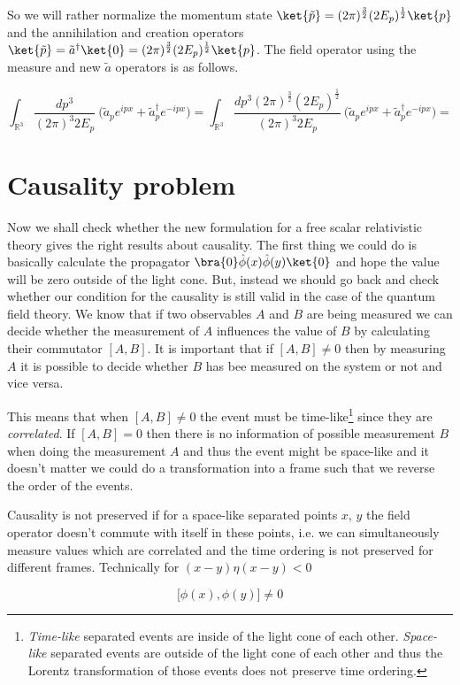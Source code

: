 So we will rather normalize the momentum state $\ket{\tilde{p}} = (2 \pi)^{\frac{3}{2}} (2 E_{p})^{\frac{1}{2}} \ket{p}$ and
the annihilation and creation operators $\ket{\tilde{p}} = \tilde{a}^{\dagger} \ket{0} = (2 \pi)^{\frac{3}{2}} (2 E_{p})^{\frac{1}{2}} \ket{p}$.
The field operator using the measure and new $\tilde{a}$ operators is as follows.

\begin{equation*}
    \int_{\mathbb{R}^{3}} \frac{dp^{3}}{(2 \pi)^{3} 2 E_{p}} \ \big(\tilde{a}_{p} e^{i p x} + \tilde{a}^{\dagger}_{p} e^{- i p x}\big) = 
    \int_{\mathbb{R}^{3}} \frac{dp^{3} (2 \pi)^{\frac{3}{2}} (2 E_{p})^{\frac{1}{2}}}{(2 \pi)^{3} 2 E_{p}} \ \big(\tilde{a}_{p} e^{i p x} + \tilde{a}^{\dagger}_{p} e^{- i p x}\big) = 
\end{equation*}

\section{Causality problem}

Now we shall check whether the new formulation for a free scalar relativistic theory gives the right results about causality.
The first thing we could do is basically calculate the propagator $\bra{0} \hat{\phi}(x) \hat{\phi}(y) \ket{0}$ and hope the 
value will be zero outside of the light cone. But, instead we should go back and check whether our condition for the causality
is still valid in the case of the quantum field theory. We know that if two observables $A$ and $B$ are being measured we can
decide whether the measurement of $A$ influences the value of $B$ by calculating their commutator $[A, B]$. It is important that
if $[A, B] \neq 0$ then by measuring $A$ it is possible to decide whether $B$ has bee measured on the system or not and vice 
versa.

This means that when $[A, B] \neq 0$ the event must be time-like\footnote{
\textit{Time-like} separated events are inside of the light cone of each other.
\textit{Space-like} separated events are outside of the light cone of each other and thus the Lorentz transformation of those 
events does not preserve time ordering.} since they are \textit{correlated}. If $[A, B] = 0$ then there is no information of possible
measurement $B$ when doing the measurement $A$ and thus the event might be space-like and it doesn't matter we could do a transformation
into a frame such that we reverse the order of the events.

\begin{definition}
    \label{df:causality_field_theory}
    Causality is not preserved if for a space-like separated points $x$, $y$ the field operator doesn't commute with itself in these points, i.e.
    we can simultaneously measure values which are correlated and the time ordering is not preserved for different frames. Technically for
    $(x - y) \eta (x - y) < 0$

    \begin{equation}
        \big[\phi(x), \phi(y)\big] \neq 0
    \end{equation}

\end{definition}

